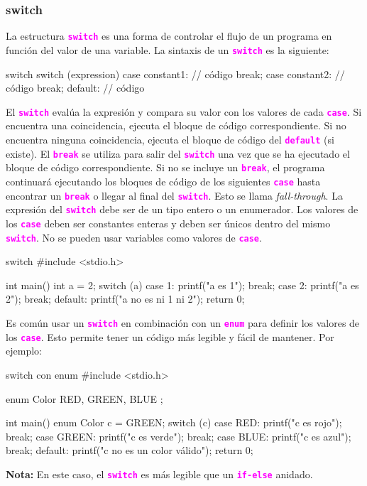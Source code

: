 \documentclass[]{scrartcl}
\newcommand{\hl}[1]{\textcolor{magenta}{\textbf{\texttt{#1}}}}
\begin{document}
\subsubsection*{switch}

La estructura \hl{switch} es una forma de controlar el flujo de un programa en función del valor de una variable. La sintaxis de un \hl{switch} es la siguiente:

\begin{cbox}[]{switch}
  switch (expression) {
    case constant1:
      // código
      break;
    case constant2:
      // código
      break;
    default:
      // código
  }
\end{cbox}

El \hl{switch} evalúa la expresión y compara su valor con los valores de cada \hl{case}. Si encuentra una coincidencia, ejecuta el bloque de código correspondiente. Si no encuentra ninguna coincidencia, ejecuta el bloque de código del \hl{default} (si existe).
El \hl{break} se utiliza para salir del \hl{switch} una vez que se ha ejecutado el bloque de código correspondiente. Si no se incluye un \hl{break}, el programa continuará ejecutando los bloques de código de los siguientes \hl{case} hasta encontrar un \hl{break} o llegar al final del \hl{switch}. Esto se llama \textit{fall-through}.
La expresión del \hl{switch} debe ser de un tipo entero o un enumerador. Los valores de los \hl{case} deben ser constantes enteras y deben ser únicos dentro del mismo \hl{switch}. No se pueden usar variables como valores de \hl{case}.

\begin{cbox}[]{switch}
  #include <stdio.h>
  
  int main() {
    int a = 2;
    switch (a) {
      case 1:
        printf("a es 1\n");
        break;
      case 2:
        printf("a es 2\n");
        break;
      default:
        printf("a no es ni 1 ni 2\n");
    }
    return 0;
  }
\end{cbox}

Es común usar un \hl{switch} en combinación con un \hl{enum} para definir los valores de los \hl{case}. Esto permite tener un código más legible y fácil de mantener. Por ejemplo:
\begin{cbox}[]{switch con enum}
  #include <stdio.h>
  
  enum Color { RED, GREEN, BLUE };
  
  int main() {
    enum Color c = GREEN;
    switch (c) {
      case RED:
        printf("c es rojo\n");
        break;
      case GREEN:
        printf("c es verde\n");
        break;
      case BLUE:
        printf("c es azul\n");
        break;
      default:
        printf("c no es un color válido\n");
    }
    return 0;
  }
\end{cbox}
\begin{notebox}
  \textbf{Nota:} En este caso, el \hl{switch} es más legible que un \hl{if-else} anidado.
\end{notebox}
\end{document}
